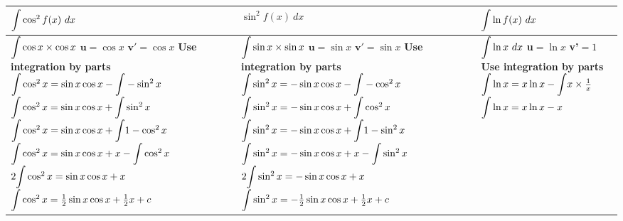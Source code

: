 \documentclass{article}
\begin{document}
\begin{tabularx}{\textwidth}{|X|X|X|}
\hline
$\mathlarger{\int}\cos^2f(x) \ dx$&$\sin^2f(x) \ dx$&$\mathlarger{\int}\ln f(x) \ dx$\\
\hline
$\mathlarger{\int}\cos x\times\cos x$\newline
$\mathbf{u}=\cos x$\newline
$\mathbf{v'}=\cos x$\newline
\newline
\textbf{Use integration by parts}\newline
$\mathlarger{\int}\cos^2x=\sin x\cos x-\mathlarger{\int}-\sin^2x$\newline
$\mathlarger{\int}\cos^2x=\sin x\cos x+\mathlarger{\int}\sin^2x$\newline
$\mathlarger{\int}\cos^2x=\sin x\cos x+\mathlarger{\int}1-\cos^2x$\newline
$\mathlarger{\int}\cos^2x=\sin x\cos x+x-\mathlarger{\int}\cos^2x$\newline
$2\mathlarger{\int}\cos^2x=\sin x\cos x+x$\newline
$\mathlarger{\int}\cos^2x=\frac{1}{2}\sin x\cos x+\frac{1}{2}x+c$
&
$\mathlarger{\int}\sin x\times\sin x$\newline
$\mathbf{u}=\sin x$\newline
$\mathbf{v'}=\sin x$\newline
\newline
\textbf{Use integration by parts}\newline
$\mathlarger{\int}\sin^2x=-\sin x\cos x-\mathlarger{\int}-\cos^2x$\newline
$\mathlarger{\int}\sin^2x=-\sin x\cos x+\mathlarger{\int}\cos^2x$\newline
$\mathlarger{\int}\sin^2x=-\sin x\cos x+\mathlarger{\int}1-\sin^2x$\newline
$\mathlarger{\int}\sin^2x=-\sin x\cos x+x-\mathlarger{\int}\sin^2x$\newline
$2\mathlarger{\int}\sin^2x=-\sin x\cos x+x$\newline
$\mathlarger{\int}\sin^2x=-\frac{1}{2}\sin x\cos x+\frac{1}{2}x+c$

&
$\mathlarger{\int}\ln x \ dx$\newline
\textbf{u}$=\ln x$\newline
\textbf{v'}$=1$\newline
\newline
\textbf{Use integration by parts}\newline
$\mathlarger{\int}\ln x=x\ln x-\mathlarger{\int}x\times\frac{1}{x}$\newline
$\mathlarger{\int}\ln x=x\ln x-x$
\\
\hline
\end{tabularx}
\end{document}
